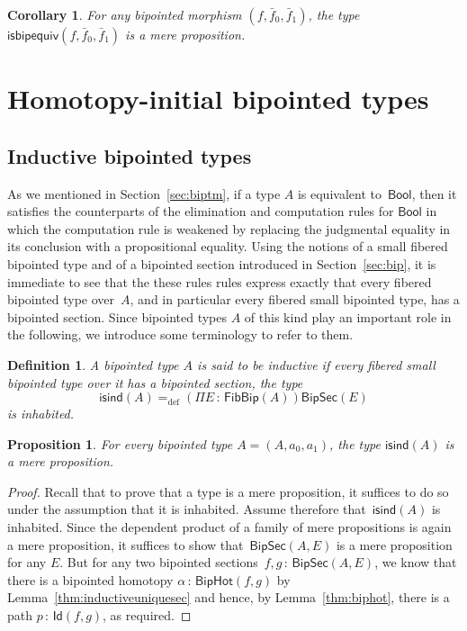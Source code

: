 \documentclass[10pt,a4paper,oneside,reqno]{amsart}
\numberwithin{equation}{section}
\theoremstyle{mythm}
\newtheorem{proposition}[theorem]{Proposition}
\newtheorem{corollary}[theorem]{Corollary}
\theoremstyle{mydef}
\newtheorem{definition}[theorem]{Definition}
\theoremstyle{myrmk}
\newcommand{\ie}{\text{i.e.\ }}
\newcommand{\defeq}{=_{\mathrm{def}}}
\newcommand{\co}{\,{:}\,}
\newcommand{\isbipind}{\mathsf{isind}}
\newcommand{\Bool}{\mathsf{Bool}}
\newcommand{\Id}{\mathsf{Id}}
\newcommand{\BipHot}{\mathsf{BipHot}}
\newcommand{\FibBip}{\mathsf{FibBip}}
\newcommand{\BipSec}{\mathsf{BipSec}}
\newcommand{\isbipequiv}{\mathsf{isbipequiv}}
\begin{document}
\begin{corollary} For any bipointed morphism $(f, \bar{f}_0, \bar{f}_1)$, the type $\isbipequiv(f, \bar{f}_0, \bar{f}_1)$ is a mere proposition.
\end{corollary} 





\section{Homotopy-initial bipointed types} 
\label{sec:homibt}


\subsection{Inductive bipointed types} 
As we mentioned  in Section~\ref{sec:biptm}, if a type $A$ is equivalent to~$\Bool$, then 
it satisfies the counterparts of the elimination and computation rules for $\Bool$ in which the computation rule is 
weakened by replacing the judgmental equality in its conclusion with a propositional equality. Using the notions of a small fibered bipointed type and of a bipointed section introduced in Section~\ref{sec:bip}, it is immediate to see that the these rules rules express exactly that every fibered bipointed type over~$A$, and in particular every fibered small bipointed type, has a bipointed section. 
Since bipointed types $A$ of this kind  play an important role in the following, we introduce some terminology to refer to them.


 



\begin{definition} A bipointed type $A$ is said to be \emph{inductive} if every fibered small bipointed type over it has a bipointed section, \ie the type
\[ 
\isbipind(A) \defeq (\Pi E \co \FibBip(A))  \BipSec(E)
\]  
is inhabited. \end{definition} 



\begin{proposition} \label{thm:isbipindisprop} For every bipointed type $A = (A, a_0, a_1)$, the type $\isbipind(A)$ is a mere proposition.
\end{proposition}

\begin{proof} Recall that to prove that a type  is a mere proposition, it suffices to do so under the assumption that it is inhabited. Assume therefore that~$\isbipind(A)$ is inhabited. Since the dependent product of a family of mere propositions is again a mere proposition, it suffices to show that~$\BipSec(A,E)$ is a mere proposition for any $E$. But for any two bipointed sections~$f, g \co \BipSec(A,E)$, we know that there is a 
bipointed homotopy $\alpha \co \BipHot(f,g)$ by Lemma~\ref{thm:inductiveuniquesec} and hence, by 
Lemma~\ref{thm:biphot}, there is a path $p \co \Id(f,g)$, as required. 
\end{proof}
\end{document}
